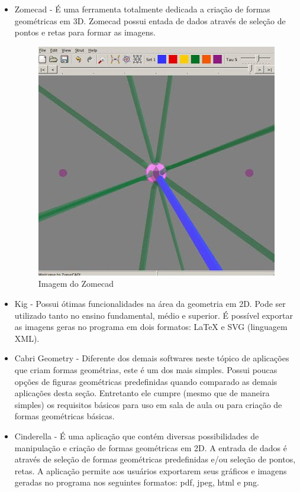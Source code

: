 \documentclass[12pt,a4paper]{article}
\begin{document}
\begin{itemize}
\begin{itemize}
\item Zomecad - É uma ferramenta totalmente dedicada a criação de formas geométricas em 3D. Zomecad possui  entada de dados através de seleção de pontos e retas para formar as imagens.

\begin{figure}[!h]
\centering
\includegraphics[scale=0.45]{imagens/zz.jpg} 
\caption{Imagem do Zomecad}
\end{figure}

\item Kig - Possui ótimas funcionalidades na área da geometria em 2D. Pode ser utilizado tanto no ensino fundamental, médio e superior. É possível exportar as imagens geras no programa em dois formatos:  LaTeX e SVG (linguagem XML).

\item Cabri Geometry - Diferente dos demais softwares neste tópico de aplicações que criam formas geométrias, este é um dos mais simples. Possui poucas opções de figuras geométricas predefinidas quando comparado as demais aplicações desta seção. Entretanto ele cumpre (mesmo que de maneira simples) os requisitos básicos para uso em sala de aula ou para criação de formas geométricas básicas.

\item Cinderella - É uma aplicação que contém diversas possibilidades de manipulação e criação de formas geométricas em 2D. A entrada de dados é através de seleção de formas geométricas predefinidas e/ou seleção de pontos, retas. A aplicação permite aos usuários exportarem seus gráficos e imagens geradas no programa nos seguintes formatos: pdf, jpeg, html e png.


\end{itemize}
\end{itemize}
\end{document}

